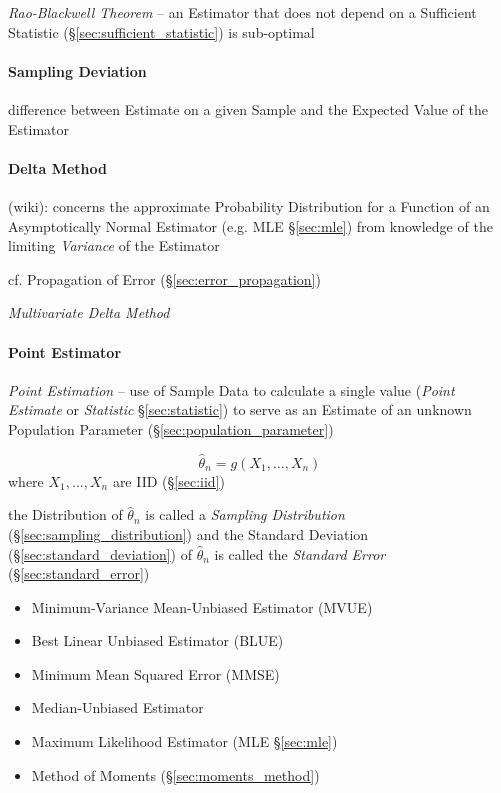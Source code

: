 \emph{Rao-Blackwell Theorem} -- an Estimator that does not depend on a
Sufficient Statistic (\S\ref{sec:sufficient_statistic}) is sub-optimal



\paragraph{Sampling Deviation}\label{sec:sampling_deviation}\hfill

difference between Estimate on a given Sample and the Expected Value of the
Estimator



\paragraph{Delta Method}\label{sec:delta_method}\hfill

(wiki): concerns the approximate Probability Distribution for a Function of an
Asymptotically Normal Estimator (e.g. MLE \S\ref{sec:mle}) from knowledge of the
limiting \emph{Variance} of the Estimator

\fist cf. Propagation of Error (\S\ref{sec:error_propagation})

\emph{Multivariate Delta Method}



\paragraph{Point Estimator}\label{sec:point_estimator}\hfill

\emph{Point Estimation} -- use of Sample Data to calculate a single value
(\emph{Point Estimate} or \emph{Statistic} \S\ref{sec:statistic}) to serve as an
Estimate of an unknown Population Parameter (\S\ref{sec:population_parameter})

\[
  \hat{\theta}_n = g(X_1, \ldots, X_n)
\]
where $X_1, \ldots, X_n$ are IID (\S\ref{sec:iid})

the Distribution of $\hat{\theta}_n$ is called a \emph{Sampling Distribution}
(\S\ref{sec:sampling_distribution}) and the Standard Deviation
(\S\ref{sec:standard_deviation}) of $\hat{\theta}_n$ is called the
\emph{Standard Error} (\S\ref{sec:standard_error})

\begin{itemize}
  \item Minimum-Variance Mean-Unbiased Estimator (MVUE)
  \item Best Linear Unbiased Estimator (BLUE)
  \item Minimum Mean Squared Error (MMSE)
  \item Median-Unbiased Estimator
  \item Maximum Likelihood Estimator (MLE \S\ref{sec:mle})
  \item Method of Moments (\S\ref{sec:moments_method})
\end{itemize}

